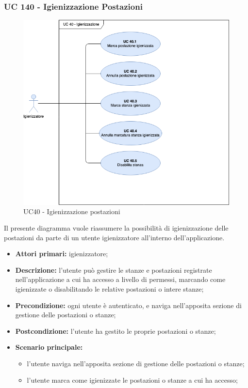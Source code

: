 \subsubsection{UC 140 - Igienizzazione Postazioni}

\begin{figure}[h]
  \centering
    \includegraphics[scale=0.5]{CasiDUso/Immagini/UC40.png}
  \caption{UC40  - Igienizzazione postazioni}
\end{figure}

Il presente diagramma vuole riassumere la possibilità di igienizzazione delle postazioni da parte di un utente igienizzatore all'interno dell’applicazione.

\begin{itemize}
\item \textbf{Attori primari:} igienizzatore;
\item \textbf{Descrizione:} l’utente può gestire le stanze e postazioni registrate nell’applicazione a cui ha accesso a livello di permessi, marcando come igienizzate o disabilitando le relative postazioni o intere stanze;
\item \textbf{Precondizione:} ogni utente è autenticato, e naviga nell’apposita sezione di gestione delle postazioni o stanze;
\item \textbf{Postcondizione:} l’utente ha gestito le proprie postazioni o stanze;
\item \textbf{Scenario principale:} 
	\begin{itemize}
		\item l’utente naviga nell’apposita sezione di gestione delle postazioni o stanze;
		\item l’utente marca come igienizzate le postazioni o stanze a cui ha accesso;
	\end{itemize}
\end{itemize}

